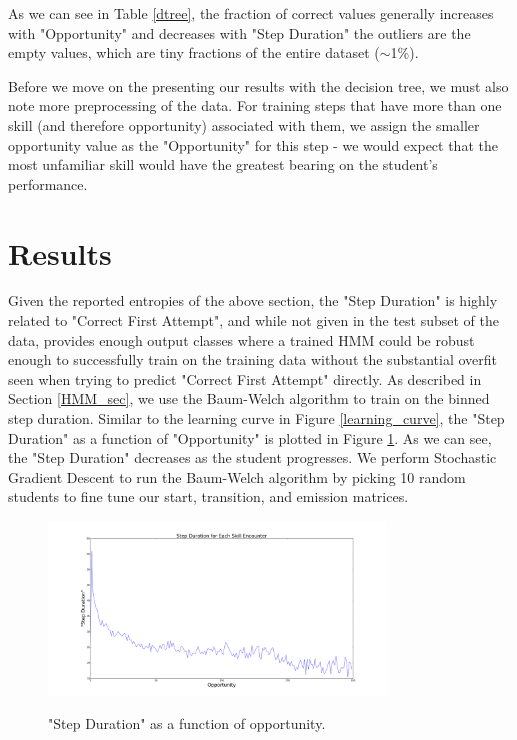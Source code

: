 \documentclass{article} %
\begin{document}
As we can see in Table \ref{dtree}, the fraction of correct values generally increases with "Opportunity" and decreases with "Step Duration" the outliers are the empty values, which are tiny fractions of the entire dataset ($\sim$1\%).

Before we move on the presenting our results with the decision tree, we must also note more preprocessing of the data. For training steps that have more than one skill (and therefore opportunity) associated with them, we assign the smaller opportunity value as the "Opportunity" for this step - we would expect that the most unfamiliar skill would have the greatest bearing on the student's performance.

\section{Results}

Given the reported entropies of the above section, the "Step Duration" is highly related to "Correct First Attempt", and while not given in the test subset of the data, provides enough output classes where a trained HMM could be robust enough to successfully train on the training data without the substantial overfit seen when trying to predict "Correct First Attempt" directly. As described in Section \ref{HMM_sec}, we use the Baum-Welch algorithm to train on the binned step duration. Similar to the learning curve in Figure \ref{learning_curve}, the "Step Duration" as a function of "Opportunity" is plotted in Figure \ref{stepdur}. As we can see, the "Step Duration" decreases as the student progresses. We perform Stochastic Gradient Descent to run the Baum-Welch algorithm by picking 10 random students to fine tune our start, transition, and emission matrices.

\begin{figure}[h]
\begin{center}
\includegraphics[width=0.8\textwidth]{stepdur_opp.png}
\label{stepdur}
\end{center}
\caption{"Step Duration" as a function of opportunity.}
\end{figure}
\end{document}

